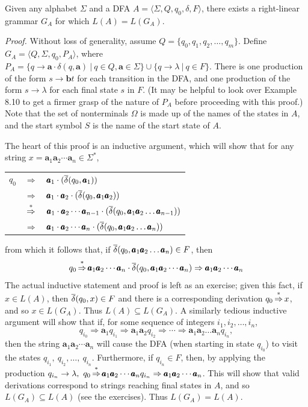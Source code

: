 \begin{lmm}\label{lmm-8.1}
Given any alphabet $\Sigma$ and a DFA $A=\langle\Sigma,Q,q_0,\delta,F\rangle$,
there exists a right-linear grammar $G_A$ for which $L(A)=L(G_A)$.

\emph{Proof.} Without loss of generality, assume $Q=\{q_0,q_1,q_2,\ldots,q_m\}$.
Define $G_A=\langle Q,\Sigma,q_0,P_A\rangle$, where $P_A=\{q\rightarrow\pmb{a}
\cdot\delta(q,\pmb{a})\ |\ q\in Q,\pmb{a}\in\Sigma\}\cup\{q\rightarrow\lambda\ |\ q \in
F\}$. There is one production of the form $s\rightarrow\pmb{b}t$ for each
transition in the DFA, and one production of the form $s\rightarrow\lambda$ for
each final state $s$ in $F$. (It may be helpful to look over Example 8.10 to get
a firmer grasp of the nature of $P_A$ before proceeding with this proof.) Note
that the set of nonterminals $\Omega$ is made up of the names of the states in
$A$, and the start symbol $S$ is the name of the start state of $A$.

The heart of this proof is an inductive argument, which will show that for any
string $x=\pmb{a}_1\pmb{a}_2\cdots\pmb{a}_n\in\Sigma^*$,
\begin{center}\begin{tabular}{r@{ }c@{ }l@{ }}
$q_0$ & $\Rightarrow$ & $\pmb{a}_1\cdot(\overline{\delta}(q_0,\pmb{a}_1))$ \\
& $\Rightarrow$ & $\pmb{a}_1\cdot\pmb{a}_2\cdot(\overline{\delta}(q_0,\pmb{a}_1\pmb{a}_2))$ \\
& $\operatorname{\overset{*}{\Rightarrow}}$ & $\pmb{a}_1\cdot\pmb{a}_2\cdots\pmb{a}_{n-1}\cdot(\overline{\delta}(q_0,
	\pmb{a}_1\pmb{a}_2\ldots\pmb{a}_{n-1}))$ \\
& $\Rightarrow$ & $\pmb{a}_1\cdot\pmb{a}_2\cdots\pmb{a}_{n}\cdot(\overline{\delta}(q_0,
	\pmb{a}_1\pmb{a}_2\ldots\pmb{a}_n))$
\end{tabular}\end{center}
from which it follows that, if $\overline{\delta}(q_0,\pmb{a}_1\pmb{a}_2\ldots\pmb{a}_n)\in
F$, then
\[ q_0 \operatorname{\overset{*}{\Rightarrow}}\pmb{a}_1\pmb{a}_2\cdots\pmb{a}_n\cdot\overline{\delta}(q_0,\pmb{a}_1
	\pmb{a}_2\cdots\pmb{a}_n)\Rightarrow\pmb{a}_1\pmb{a}_2\cdots\pmb{a}_n \]
The actual inductive statement and proof is left as an exercise; given this
fact, if $x\in L(A)$, then $\overline{\delta}(q_0,x)\in F$ and there is a corresponding
derivation $q_0 \operatorname{\overset{*}{\Rightarrow}} x$, and so $x\in L(G_A)$. Thus $L(A)\subseteq
L(G_A)$. A similarly tedious inductive argument will show that if, for some
sequence of integers $i_1,i_2,\ldots,i_n$,
\[ q_{i_0}\Rightarrow\pmb{a}_1q_{i_1}\Rightarrow\pmb{a}_1\pmb{a}_2q_{i_2}
	\Rightarrow\cdots\Rightarrow\pmb{a}_1\pmb{a}_2\ldots\pmb{a}_nq_{i_n}, \]
then the string $\pmb{a}_1\pmb{a}_2\cdots\pmb{a}_n$ will cause the DFA (when
starting in state $q_{i_0}$) to visit the states $q_{i_1},\ q_{i_2},\ldots,\ 
q_{i_n}$. Furthermore, if $q_{i_n} \in F$, then, by applying the production
$q_{i_n}\rightarrow\lambda,\ q_0 \operatorname{\overset{*}{\Rightarrow}}\pmb{a}_1\pmb{a}_2\cdots\pmb{a}_n
q_{i_n}\Rightarrow\pmb{a}_1\pmb{a}_2\cdots\pmb{a}_n$. This will show that valid
derivations correspond to strings reaching final states in $A$, and so $L(G_A)
\subseteq L(A)$ (see the exercises). Thus $L(G_A)=L(A)$.
\end{lmm}

